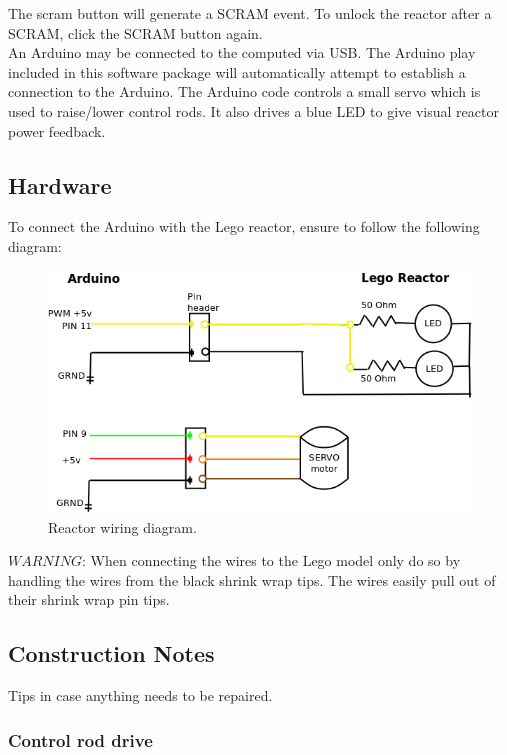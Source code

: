 \documentclass[8pt]{article}
\begin{document}
The scram button will generate a SCRAM event. To unlock the reactor after a SCRAM, click the SCRAM button again. \\

An Arduino may be connected to the computed via USB. The Arduino play included in this software package will automatically attempt to establish a connection to the Arduino. The Arduino code controls a small servo which is used to raise/lower control rods. It also drives a blue LED to give visual reactor power feedback.

\subsection{Hardware}

To connect the Arduino with the Lego reactor, ensure to follow the following diagram: \\

\begin{figure}[h]
\centering
\includegraphics[scale=0.5]{wire_dia.png}
\caption{Reactor wiring diagram.}
\end{figure}

$WARNING$:  When connecting the wires to the Lego model only do so by handling the wires from the black shrink wrap tips.  The wires easily pull out of their shrink wrap pin tips.  

\subsection{Construction Notes}

Tips in case anything needs to be repaired.

\subsubsection{Control rod drive}
\end{document}
